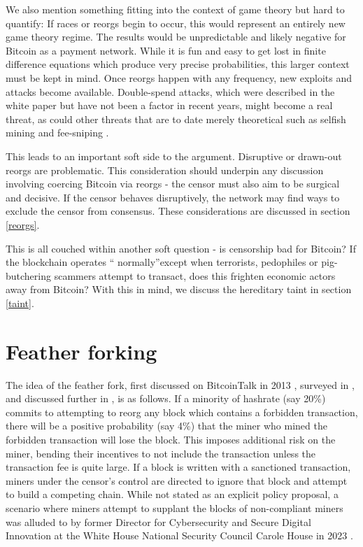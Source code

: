 \documentclass{article}%
\begin{document}
We also mention something fitting into the context of game theory but hard to
quantify: If races or reorgs begin to occur, this would represent an entirely
new game theory regime.  The results would be unpredictable and likely negative for Bitcoin as a payment network.   While it is fun and easy to get lost in finite
difference equations which produce very precise probabilities, this larger context must be kept in
mind.  Once reorgs happen with any frequency, new exploits and attacks become
available.  Double-spend attacks, which were described in the white paper
\cite{Nakamoto08} but have not been a factor in recent years, might become a real threat, as could other threats that
are to date merely theoretical such as selfish mining
\cite{ES14} and fee-sniping \cite{Carlsten16}.

This leads to an important
soft side to the argument. Disruptive or drawn-out reorgs are problematic.
This consideration should underpin any discussion involving coercing Bitcoin
via reorgs - the censor must also aim to be surgical and decisive.  If the censor behaves
disruptively, the network may find ways to exclude the censor from
consensus. These considerations are discussed in section \ref{reorgs}.

This is all couched within another soft question - is censorship bad for Bitcoin?  If the blockchain operates \textquotedblleft
normally\textquotedblright except  when terrorists, pedophiles or
pig-butchering scammers attempt to transact, does this frighten economic actors away from Bitcoin?  With this in mind, we discuss the hereditary taint in section  \ref{taint}.

\section{Feather forking \label{feather}}

The idea of the feather fork, first discussed on BitcoinTalk in 2013  \cite{Miller13},
surveyed in \cite{Bonneau15}, and discussed further in \cite{HW}, is as follows.  If a
minority of hashrate (say 20\%) commits to attempting to reorg any block which
contains a forbidden transaction, there will be a positive probability (say
4\%) that the miner who mined the forbidden transaction will lose the block.
This imposes additional risk on the miner, bending their incentives to not
include the transaction unless the transaction fee is quite large.  If a
block is written with a sanctioned transaction, miners under the censor's
control are directed to ignore that block and attempt to build a competing
chain.  While not stated as an explicit policy proposal, a scenario where
miners attempt to supplant the blocks of non-compliant miners was alluded to by
former Director for Cybersecurity and Secure Digital Innovation at the White
House National Security Council Carole House in 2023 \cite{House23}.
\end{document}
